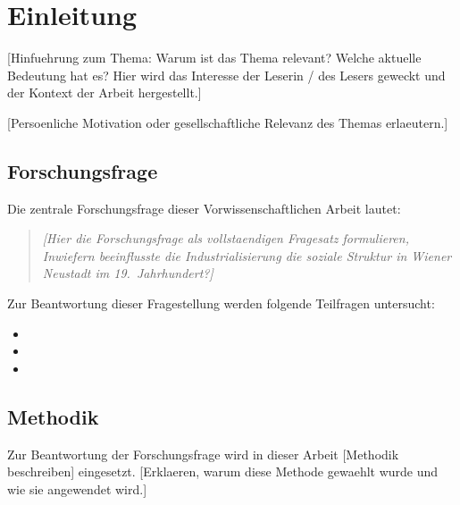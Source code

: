 
\chapter{Einleitung}
\label{chap:einleitung}


[Hinfuehrung zum Thema: Warum ist das Thema relevant? Welche aktuelle
Bedeutung hat es? Hier wird das Interesse der Leserin / des Lesers geweckt
und der Kontext der Arbeit hergestellt.]

[Persoenliche Motivation oder gesellschaftliche Relevanz des Themas
erlaeutern.]


\section{Forschungsfrage}
\label{sec:forschungsfrage}

Die zentrale Forschungsfrage dieser Vorwissenschaftlichen Arbeit lautet:

\begin{quote}
\textit{[Hier die Forschungsfrage als vollstaendigen Fragesatz formulieren,
\zB \glqq Inwiefern beeinflusste die Industrialisierung die soziale Struktur
in Wiener Neustadt im 19.~Jahrhundert?\grqq]}
\end{quote}

Zur Beantwortung dieser Fragestellung werden folgende Teilfragen untersucht:
\begin{itemize}
  \item [Teilfrage 1]
  \item [Teilfrage 2]
  \item [Teilfrage 3]
\end{itemize}


\section{Methodik}
\label{sec:methodik}

Zur Beantwortung der Forschungsfrage wird in dieser Arbeit
[Methodik beschreiben] eingesetzt. [Erklaeren, warum diese Methode
gewaehlt wurde und wie sie angewendet wird.]

